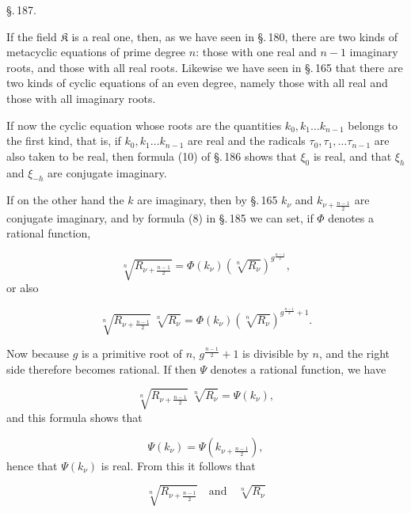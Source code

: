 \begin{center}
\S.\,187.

\end{center}

If the field $\mathfrak{K}$ is a real one, then, as we have seen in §.\,180, there are two kinds of metacyclic equations of prime degree $n$: those with one real and $n-1$ imaginary roots, and those with all real roots. Likewise we have seen in §.\,165 that there are two kinds of cyclic equations of an even degree, namely those with all real and those with all imaginary roots.

If now the cyclic equation whose roots are the quantities $k_0, k_1 \ldots k_{n-1}$ belongs to the first kind, that is, if $k_0, k_1 \ldots k_{n-1}$ are real and the radicals $\tau_0, \tau_1, \ldots \tau_{n-1}$ are also taken to be real, then formula (10) of §.\,186 shows that $\xi_0$ is real, and that $\xi_h$ and $\xi_{-h}$ are conjugate imaginary.

If on the other hand the $k$ are imaginary, then by §.\,165 $k_\nu$ and $k_{\nu+\frac{n-1}{2}}$ are conjugate imaginary, and by formula (8) in §.\,185 we can set, if $\Phi$ denotes a rational function,

\[
\sqrt[n]{R_{\nu+\frac{n-1}{2}}} = \Phi(k_\nu) \left(\sqrt[n]{R_\nu}\right)^{g^{\frac{n-1}{2}}},
\]
or also

\[
\sqrt[n]{R_{\nu+\frac{n-1}{2}}}\ \sqrt[n]{R_\nu} = \Phi(k_\nu) \left(\sqrt[n]{R_\nu}\right)^{g^{\frac{n-1}{2}}+1}.
\]

Now because $g$ is a primitive root of $n$, $g^{\frac{n-1}{2}}+1$ is divisible by $n$, and the right side therefore becomes rational. If then $\Psi$ denotes a rational function, we have

\[
\sqrt[n]{R_{\nu+\frac{n-1}{2}}}\ \sqrt[n]{R_\nu} = \Psi(k_\nu),
\]
and this formula shows that

\[
\Psi(k_\nu) = \Psi\!\left(k_{\nu+\frac{n-1}{2}}\right),
\]
hence that $\Psi(k_\nu)$ is real. From this it follows that

\[
\sqrt[n]{R_{\nu+\frac{n-1}{2}}} \quad \text{and} \quad \sqrt[n]{R_\nu}
\]
